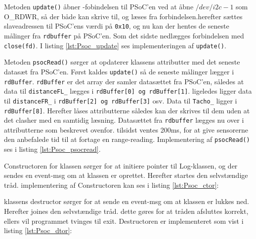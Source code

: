 Metoden \texttt{update()} åbner \IIC-fobindelsen til PSoC'en ved at åbne $/dev/i2c-1$ som O\_RDWR, så der både kan skrive til, og læses fra forbindelsen.herefter sættes slaveadressen til PSoC'ens værdi på \texttt{0x10}, og nu kan der hentes de seneste målinger fra \texttt{rdbuffer} på PSoC'en. Som det sidste nedlægges forbindelsen med \texttt{close(fd)}. I listing \ref{lst:Psoc_update} ses implementeringen af \texttt{update()}.




Metoden \texttt{psocRead()} sørger at opdaterer klassens attributter med det seneste datasæt fra PSoC'en. Først kaldes \texttt{update()} så de seneste målinger lægger i \texttt{rdBuffer}. \texttt{rdBuffer} er det array der samler datasættet fra PSoC'en, således at data til \texttt{distanceFL\_} lægges i \texttt{rdBuffer[0] og rdBuffer[1]}. ligeledes ligger data til \texttt{distanceFR\_} i \texttt{rdBuffer[2] og rdBuffer[3]} osv. Data til \texttt{Tacho\_} ligger i \texttt{rdBuffer[8]}. Herefter låses attributterne således kan der skrives til dem uden at det clasher med en samtidig læsning. Datasættet fra \texttt{rdbuffer} lægges nu over i attributterne som beskrevet ovenfor. tilsidst ventes 200ms, for at give sensorerne den anbefalede tid til at fortage en range-reading. Implementering af \texttt{psocRead()} ses i listing \ref{lst:Psoc_psocread}.




Constructoren for klassen sørger for at initiere pointer til Log-klassen, og der sendes en event-msg om at klassen er oprettet. Herefter startes den selvstændige tråd. implementering af Constructoren kan ses i listing \ref{lst:Psoc_ctor}:




klassens destructor sørger for at sende en event-msg om at klassen er lukkes ned. Herefter joines den selvstændige tråd. dette gøres for at tråden afsluttes korrekt, ellers vil programmet tvinges til exit. Destructoren er implementeret som vist i listing \ref{lst:Psoc_dtor}:

